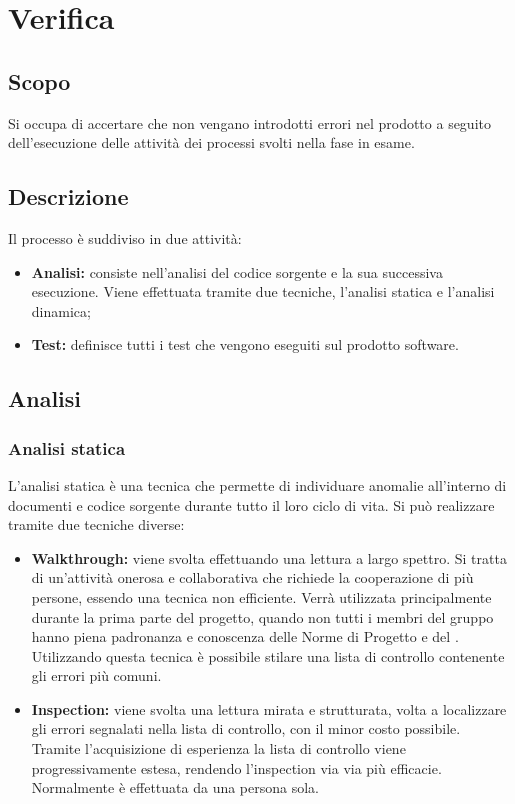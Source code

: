 \documentclass[../NormeDiProgetto.tex]{subfiles}
\begin{document}
	
\section{Verifica}
\subsection{Scopo}
Si occupa di accertare che non vengano introdotti errori nel prodotto a seguito dell’esecuzione delle attività dei processi svolti nella fase in esame.
\subsection{Descrizione}
Il processo è suddiviso in due attività:
\begin{itemize}
\item \textbf{Analisi:} consiste nell’analisi del codice sorgente e la sua successiva esecuzione.
Viene effettuata tramite due tecniche, l’analisi statica e l’analisi dinamica;
\item \textbf{Test:} definisce tutti i test che vengono eseguiti sul prodotto software.
\end{itemize}
\subsection{Analisi}
\subsubsection{Analisi statica}
L’analisi statica è una tecnica che permette di individuare anomalie all’interno di documenti
e codice sorgente durante tutto il loro ciclo di vita. Si può realizzare tramite due
tecniche diverse:
\begin{itemize}
\item \textbf{Walkthrough:} viene svolta effettuando una lettura a largo spettro. Si tratta
di un’attività onerosa e collaborativa che richiede la cooperazione di più persone,
essendo una tecnica non efficiente. Verrà utilizzata principalmente durante la prima
parte del progetto, quando non tutti i membri del gruppo hanno piena padronanza
e conoscenza delle Norme di Progetto e del . Utilizzando questa
tecnica è possibile stilare una lista di controllo contenente gli errori più comuni.
\item \textbf{Inspection:} viene svolta una lettura mirata e strutturata, volta a localizzare gli
errori segnalati nella lista di controllo, con il minor costo possibile. Tramite l’acquisizione
di esperienza la lista di controllo viene progressivamente estesa, rendendo
l’inspection via via più efficacie. Normalmente è effettuata da una persona sola.
\end{itemize}
\end{document}
